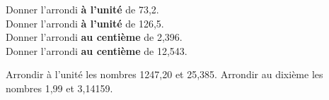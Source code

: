 \begin{methode*1}[Arrondir]

\begin{exemple*1}
Donner l'arrondi \textbf{à l'unité} de 73,2.\\
Donner l'arrondi \textbf{à l'unité} de 126,5.\\
Donner l'arrondi \textbf{au centième} de 2,396.\\
Donner l'arrondi \textbf{au centième} de 12,543.\\

\end{exemple*1}

\exercice

Arrondir à l'unité les nombres 1247,20 et 25,385. Arrondir au dixième les nombres 1,99 et 3,14159.


\end{methode*1}
